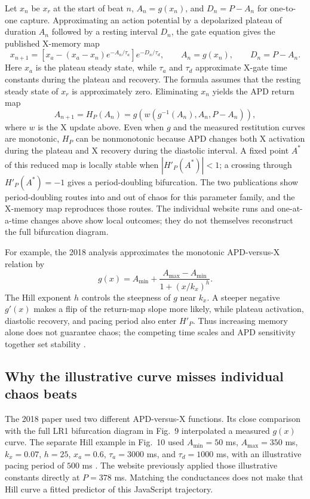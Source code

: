 \documentclass[11pt]{article}
\begin{document}
Let $x_n$ be $x_r$ at the start of beat $n$, $A_n=g(x_n)$, and $D_n=P-A_n$ for one-to-one capture. Approximating an action potential by a depolarized plateau of duration $A_n$ followed by a resting interval $D_n$, the gate equation gives the published X-memory map
\begin{equation}
 x_{n+1}=\left[x_a-(x_a-x_n)e^{-A_n/\tau_a}\right]e^{-D_n/\tau_d},
 \qquad A_n=g(x_n),\qquad D_n=P-A_n.
\end{equation}
Here $x_a$ is the plateau steady state, while $\tau_a$ and $\tau_d$ approximate X-gate time constants during the plateau and recovery. The formula assumes that the resting steady state of $x_r$ is approximately zero. Eliminating $x_n$ yields the APD return map
\begin{equation}
 A_{n+1}=H_P(A_n)
 =g\!\left(w\!\left(g^{-1}(A_n),A_n,P-A_n\right)\right),
\end{equation}
where $w$ is the X update above. Even when $g$ and the measured restitution curves are monotonic, $H_P$ can be nonmonotonic because APD changes both X activation during the plateau and X recovery during the diastolic interval. A fixed point $A^*$ of this reduced map is locally stable when $|H'_P(A^*)|<1$; a crossing through $H'_P(A^*)=-1$ gives a period-doubling bifurcation. The two publications show period-doubling routes into and out of chaos for this parameter family, and the X-memory map reproduces those routes. The individual website runs and one-at-a-time changes above show local outcomes; they do not themselves reconstruct the full bifurcation diagram.

For example, the 2018 analysis approximates the monotonic APD-versus-X relation by
\begin{equation}
 g(x)=A_{\min}+\frac{A_{\max}-A_{\min}}{1+(x/k_x)^h}.
\end{equation}
The Hill exponent $h$ controls the steepness of $g$ near $k_x$. A steeper negative $g'(x)$ makes a flip of the return-map slope more likely, while plateau activation, diastolic recovery, and pacing period also enter $H'_P$. Thus increasing memory alone does not guarantee chaos; the competing time scales and APD sensitivity together set stability \cite{landaw2018}.

\subsection{Why the illustrative curve misses individual chaos beats}

The 2018 paper used two different APD-versus-X functions. Its close comparison with the full LR1 bifurcation diagram in Fig.~9 interpolated a measured $g(x)$ curve. The separate Hill example in Fig.~10 used $A_{\min}=50$ ms, $A_{\max}=350$ ms, $k_x=0.07$, $h=25$, $x_a=0.6$, $\tau_a=3000$ ms, and $\tau_d=1000$ ms, with an illustrative pacing period of $500$ ms \cite{landaw2018}. The website previously applied those illustrative constants directly at $P=378$ ms. Matching the conductances does not make that Hill curve a fitted predictor of this JavaScript trajectory.
\end{document}
